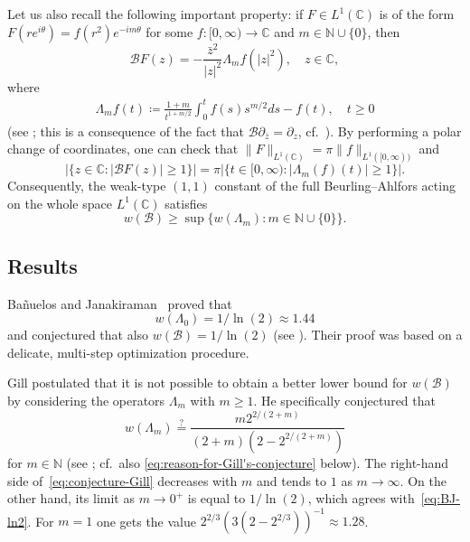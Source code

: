 \documentclass[a4paper]{amsart} %
\theoremstyle{definition}
\theoremstyle{remark}
\numberwithin{equation}{section}
\newcommand*{\CC}{\mathbb{C}}
\newcommand*{\NNzero}{\mathbb{N}\cup\{0\}}
\newcommand*{\NNone}{\mathbb{N}}
\newcommand*{\BA}{\mathcal{B}}
\newcommand*{\weakconst}[1]{w(#1)} %
\begin{document}
Let us also recall the following important property:
if $F\in L^1(\CC)$ is of the form 
$F(re^{i\theta}) = f(r^2) e^{-im\theta}$
for some $f\colon[0,\infty)\to\CC$ and $m\in\NNzero$, then
\begin{equation*}
\BA F(z) = - \frac{\bar{z}^2}{|z|^2} \Lambda_m f(|z|^2),
\quad z\in \CC,
\end{equation*}
where  
\begin{align*}
\Lambda_m f(t) \coloneqq \frac{1+m}{t^{1+m/2}} \int_0^t f(s) s^{m/2} ds - f(t),
\quad t\geq 0
\end{align*}
(see \cite[Theorem~2.1]{MR2595549}; this is a consequence of the fact that $\BA \partial_{\bar{z}} = \partial_{z}$, cf.\ \cite{MR0856530}). 
By performing a polar change of coordinates, one can check that 
$\| F \|_{L^1(\CC)} =\pi \| f\|_{L^1([0,\infty))}$ 
and 
\[
\bigl|\{z\in \CC : |\BA F(z)|\geq 1\} \bigr| 
= \pi \bigl|\{t\in[0,\infty) : |\Lambda_m(f)(t)|\geq 1\} \bigr|.
\]
Consequently, the weak-type $(1,1)$ constant of the full Beurling--Ahlfors acting on the whole space $L^1(\CC)$
satisfies
\begin{equation*}
\weakconst{\BA} \geq \sup \bigl\{\weakconst{\Lambda_m} : m\in\NNzero\bigr\}.
\end{equation*}





\subsection{Results}



Ba\~nuelos and Janakiraman~\cite{MR2595549} proved that 
\begin{equation}
\label{eq:BJ-ln2}
\weakconst{\Lambda_0}=1/\ln(2) \approx 1.44
\end{equation}
and conjectured  that also $\weakconst{\BA} = 1/\ln(2)$
(see \cite[Conjecture~2]{MR2595549}).
Their proof was based on a delicate, multi-step optimization procedure.


Gill \cite{MR2677626}  postulated that 
it is not possible
to obtain a better lower bound for $\weakconst{\BA}$ 
by considering the operators $\Lambda_m$ with $m\geq 1$. 
He specifically conjectured that
\begin{equation}
\label{eq:conjecture-Gill}
\weakconst{\Lambda_m} \overset{\text{?}}{=} \frac{m 2^{2/(2+m)}}{(2+m)(2-2^{2/(2+m)})}
\end{equation} 
for $m\in\NNone$ 
(see \cite[Conjecture~1]{MR2677626}; cf.\ also \eqref{eq:reason-for-Gill's-conjecture} below).
The right-hand side of~\eqref{eq:conjecture-Gill} decreases with $m$ 
and tends to $1$ as $m\to\infty$.
On the other hand,
its limit as $m\to 0^+$ is equal to $1/\ln(2)$, 
which agrees with~\eqref{eq:BJ-ln2}. 
For $m=1$ one gets the value %
 $2^{2/3}(3(2-2^{2/3}))^{-1} \approx 1.28$.
\end{document}
